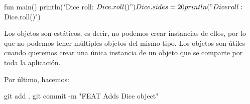  \begin{kotlin}
    fun main() {
      println("Dice roll: ${Dice.roll()}")
      Dice.sides = 20
      println("Dice roll: ${Dice.roll()}")
    }
  \end{kotlin}

  \begin{important}
    Los objetos son estáticos, es decir, no podemos crear instancias de ellos, por lo que no podemos
    tener múltiples objetos del mismo tipo.
    Los objetos son útiles cuando queremos crear una única instancia de un objeto que se comparte
    por toda la aplicación.
  \end{important}

  Por último, hacemos:

  \begin{powershell}
    git add .
    git commit -m "FEAT Adds Dice object"
  \end{powershell}